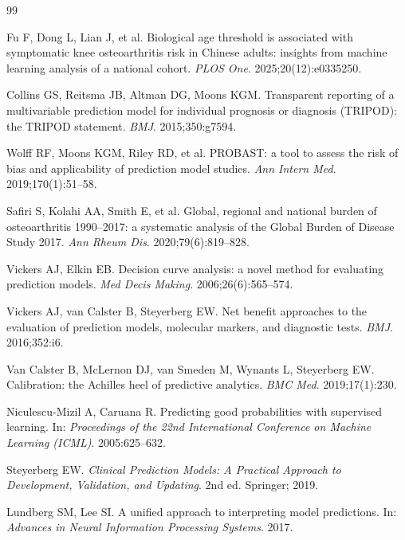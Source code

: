 \documentclass[11pt,a4paper]{article}
\begin{document}
\begin{thebibliography}{99}

 Fu F, Dong L, Lian J, et al. Biological age threshold is associated with
symptomatic knee osteoarthritis risk in Chinese adults: insights from machine learning analysis
of a national cohort. \textit{PLOS One}. 2025;20(12):e0335250.

 Collins GS, Reitsma JB, Altman DG, Moons KGM. Transparent reporting of a
multivariable prediction model for individual prognosis or diagnosis (TRIPOD): the TRIPOD statement.
\textit{BMJ}. 2015;350:g7594.

 Wolff RF, Moons KGM, Riley RD, et al. PROBAST: a tool to assess the risk of
bias and applicability of prediction model studies. \textit{Ann Intern Med}. 2019;170(1):51--58.

 Safiri S, Kolahi AA, Smith E, et al. Global, regional and national burden of
osteoarthritis 1990--2017: a systematic analysis of the Global Burden of Disease Study 2017.
\textit{Ann Rheum Dis}. 2020;79(6):819--828.

 Vickers AJ, Elkin EB. Decision curve analysis: a novel method for evaluating
prediction models. \textit{Med Decis Making}. 2006;26(6):565--574.

 Vickers AJ, van Calster B, Steyerberg EW. Net benefit approaches to the
evaluation of prediction models, molecular markers, and diagnostic tests. \textit{BMJ}. 2016;352:i6.

 Van Calster B, McLernon DJ, van Smeden M, Wynants L, Steyerberg EW.
Calibration: the Achilles heel of predictive analytics. \textit{BMC Med}. 2019;17(1):230.

 Niculescu-Mizil A, Caruana R. Predicting good probabilities with
supervised learning. In: \textit{Proceedings of the 22nd International Conference on Machine
Learning (ICML)}. 2005:625--632.

 Steyerberg EW. \textit{Clinical Prediction Models: A Practical Approach
to Development, Validation, and Updating}. 2nd ed. Springer; 2019.

 Lundberg SM, Lee SI. A unified approach to interpreting model predictions.
In: \textit{Advances in Neural Information Processing Systems}. 2017.


\end{thebibliography}
\end{document}
